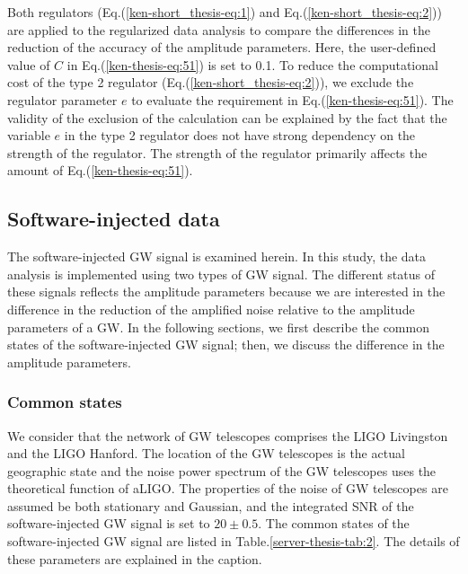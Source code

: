 \documentclass[%
 aps,
 prd,
 amsmath,amssymb,
 reprint,%
superscriptaddress
]{revtex4-1}
\begin{document}
Both regulators (Eq.(\ref{ken-short_thesis-eq:1}) and Eq.(\ref{ken-short_thesis-eq:2})) are applied to the regularized data analysis to compare the differences in the reduction of the accuracy of the amplitude parameters. Here, the user-defined value of
$C$ in Eq.(\ref{ken-thesis-eq:51}) is set to 0.1. To reduce the computational cost of the type 2 regulator (Eq.(\ref{ken-short_thesis-eq:2})), we exclude the regulator parameter
$e$ to evaluate the requirement in Eq.(\ref{ken-thesis-eq:51}). The validity of the exclusion of the calculation can be explained by the fact that the variable
$e$ in the type 2 regulator does not have strong dependency on the strength of the regulator. The strength of the regulator primarily affects the amount of Eq.(\ref{ken-thesis-eq:51}).

\subsection{Software-injected data}\label{server-thesis-sec:cond-impl}
The software-injected GW signal is examined herein.  In this study, the data analysis is implemented using two types of GW signal. The different status of these signals reflects the amplitude parameters because we are interested in the difference in the reduction of the amplified noise relative to the amplitude parameters of a GW. In the following sections, we first describe the common states of the software-injected GW signal; then, we discuss the difference in the amplitude parameters.
\subsubsection{Common states}\label{ken-short_thesis-sec:common-status}
We consider that the network of GW telescopes comprises the LIGO Livingston and the LIGO Hanford\cite{0264-9381-32-7-074001}. The location of the GW telescopes is the actual geographic state\cite{1996gr.qc.....7075A} and the noise power spectrum of the GW telescopes uses the theoretical function of aLIGO\cite{lrr-2009-2}. The properties of the noise of GW telescopes are assumed be both stationary and Gaussian, and the integrated SNR of the software-injected GW signal is set to
$20\pm 0.5$. The common states of the software-injected GW signal are listed in Table.\ref{server-thesis-tab:2}. The details of these parameters are explained in the caption.
\end{document}
